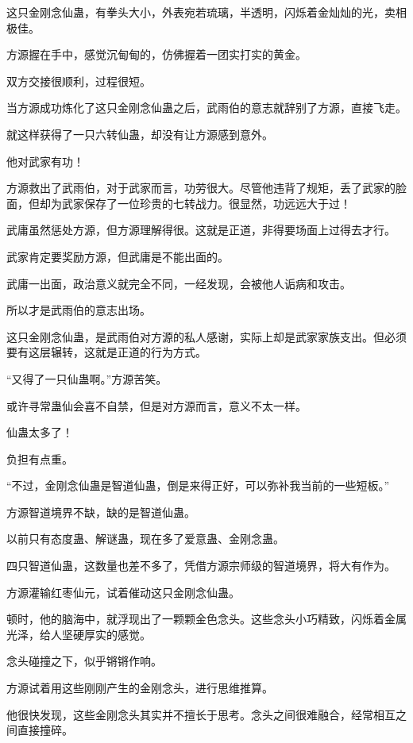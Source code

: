 
\begin{this_body}

这只金刚念仙蛊，有拳头大小，外表宛若琉璃，半透明，闪烁着金灿灿的光，卖相极佳。

方源握在手中，感觉沉甸甸的，仿佛握着一团实打实的黄金。

双方交接很顺利，过程很短。

当方源成功炼化了这只金刚念仙蛊之后，武雨伯的意志就辞别了方源，直接飞走。

就这样获得了一只六转仙蛊，却没有让方源感到意外。

他对武家有功！

方源救出了武雨伯，对于武家而言，功劳很大。尽管他违背了规矩，丢了武家的脸面，但却为武家保存了一位珍贵的七转战力。很显然，功远远大于过！

武庸虽然惩处方源，但方源理解得很。这就是正道，非得要场面上过得去才行。

武家肯定要奖励方源，但武庸是不能出面的。

武庸一出面，政治意义就完全不同，一经发现，会被他人诟病和攻击。

所以才是武雨伯的意志出场。

这只金刚念仙蛊，是武雨伯对方源的私人感谢，实际上却是武家家族支出。但必须要有这层辗转，这就是正道的行为方式。

“又得了一只仙蛊啊。”方源苦笑。

或许寻常蛊仙会喜不自禁，但是对方源而言，意义不太一样。

仙蛊太多了！

负担有点重。

“不过，金刚念仙蛊是智道仙蛊，倒是来得正好，可以弥补我当前的一些短板。”

方源智道境界不缺，缺的是智道仙蛊。

以前只有态度蛊、解谜蛊，现在多了爱意蛊、金刚念蛊。

四只智道仙蛊，这数量也差不多了，凭借方源宗师级的智道境界，将大有作为。

方源灌输红枣仙元，试着催动这只金刚念仙蛊。

顿时，他的脑海中，就浮现出了一颗颗金色念头。这些念头小巧精致，闪烁着金属光泽，给人坚硬厚实的感觉。

念头碰撞之下，似乎锵锵作响。

方源试着用这些刚刚产生的金刚念头，进行思维推算。

他很快发现，这些金刚念头其实并不擅长于思考。念头之间很难融合，经常相互之间直接撞碎。


\end{this_body}
